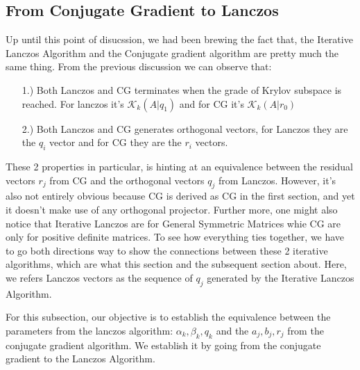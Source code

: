 \documentclass[]{article}
\theoremstyle{definition}
\begin{document}
    \subsection{From Conjugate Gradient to Lanczos}
        Up until this point of disucssion, we had been brewing the fact that, the Iterative Lanczos Algorithm and the Conjugate gradient algorithm are pretty much the same thing. From the previous discussion we can observe that: 
        \begin{enumerate}
            \item [1.)] Both Lanczos and CG terminates when the grade of Krylov subspace is reached. For lanczos it's $\mathcal K_k(A|q_1)$ and for CG it's $\mathcal K_k(A|r_0)$
            \item [2.)] Both Lanczos and CG generates orthogonal vectors, for Lanczos they are the $q_i$ vector and for CG they are the $r_i$ vectors. 
        \end{enumerate}
        These 2 properties in particular, is hinting at an equivalence between the residual vectors $r_j$ from CG and the orthogonal vectors $q_j$ from Lanczos. However, it's also not entirely obvious because CG is derived as CG in the first section, and yet it doesn't make use of any orthogonal projector. Further more, one might also notice that Iterative Lanczos are for General Symmetric Matrices whie CG are only for positive definite matrices. To see how everything ties together, we have to go both directions way to show the connections between these 2 iterative algorithms, which are what this section and the subsequent section about. Here, we refers Lanczos vectors as the sequence of $q_j$ generated by the Iterative Lanczos Algorithm. 
        \par
        For this subsection, our objective is to establish the equivalence between the parameters from the lanczos algorithm: $\alpha_k, \beta_k, q_k$ and the $a_j, b_j, r_j$ from the conjugate gradient algorithm. We establish it by going from the conjugate gradient to the Lanczos Algorithm. 
\end{document}
